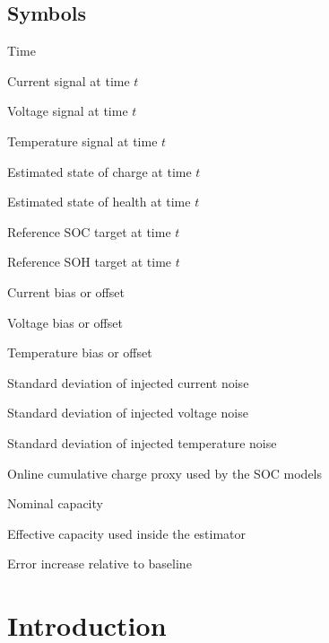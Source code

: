 \documentclass[review,nopreprintline]{elsarticle}
\begin{document}
\subsection*{Symbols}
\begin{description}[style=multiline,leftmargin=1.7cm,font=\bfseries]
\item[$t$] Time
\item[$I(t)$] Current signal at time $t$
\item[$U(t)$] Voltage signal at time $t$
\item[$T(t)$] Temperature signal at time $t$
\item[$\widehat{\mathrm{SOC}}(t)$] Estimated state of charge at time $t$
\item[$\widehat{\mathrm{SOH}}(t)$] Estimated state of health at time $t$
\item[$\mathrm{SOC}_{\mathrm{ref}}(t)$] Reference SOC target at time $t$
\item[$\mathrm{SOH}_{\mathrm{ref}}(t)$] Reference SOH target at time $t$
\item[$\Delta I$] Current bias or offset
\item[$\Delta U$] Voltage bias or offset
\item[$\Delta T$] Temperature bias or offset
\item[$\sigma_I$] Standard deviation of injected current noise
\item[$\sigma_U$] Standard deviation of injected voltage noise
\item[$\sigma_T$] Standard deviation of injected temperature noise
\item[$Q_c$] Online cumulative charge proxy used by the SOC models
\item[$C_{\mathrm{nom}}$] Nominal capacity
\item[$C_{\mathrm{eff}}$] Effective capacity used inside the estimator
\item[$\Delta\mathrm{MAE}$] Error increase relative to baseline
\end{description}
\normalsize

\section{Introduction}
\end{document}
